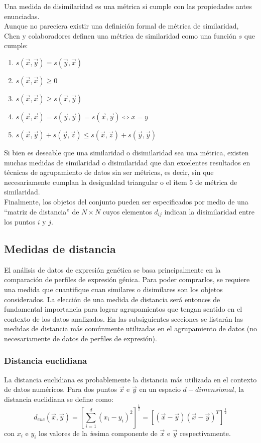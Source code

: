 Una medida de disimilaridad es una métrica si cumple con las propiedades antes enunciadas. \\
Aunque no pareciera existir una definición formal de métrica de similaridad, Chen y colaboradores definen una métrica de similaridad como una función $s$ que cumple:
\begin{enumerate}
\item $s(\vec{x}, \vec{y}) = s(\vec{y}, \vec{x})$
\item $s(\vec{x}, \vec{x}) \geq 0$
\item $s(\vec{x}, \vec{x}) \geq s(\vec{x}, \vec{y})$
\item $s(\vec{x}, \vec{x}) = s(\vec{y}, \vec{y}) = s(\vec{x}, \vec{y}) \iff x=y$
\item $s(\vec{x}, \vec{y}) + s(\vec{y}, \vec{z}) \leq s(\vec{x}, \vec{z}) + s(\vec{y}, \vec{y})$
\end{enumerate}
Si bien es deseable que una similaridad o disimilaridad sea una métrica, existen muchas medidas de similaridad o disimilaridad que dan excelentes resultados en técnicas de agrupamiento de datos sin ser métricas, es decir, sin que necesariamente cumplan la desigualdad triangular o el item 5 de métrica de similaridad.\cite{Chen2009}\\
Finalmente, los objetos del conjunto pueden ser especificados por medio de una ``matriz de distancia'' de $N\times N$ cuyos elementos $d_{ij}$ indican la disimilaridad entre los puntos $i$ y $j$.\cite{Halkidi2001, Domany1999, Gan2007, Kheng2010}

\subsection{Medidas de distancia}
El análisis de datos de expresión genética se basa principalmente en la comparación de perfiles de expresión génica. Para poder comprarlos, se requiere una medida que cuantifique cuan similares o disimilares son los objetos considerados. La elección de una medida de distancia será entonces de fundamental importancia para lograr agrupamientos que tengan sentido en el contexto de los datos analizados. En las subsiguientes secciones se listarán las medidas de distancia más comúnmente utilizadas en el agrupamiento de datos (no necesariamente de datos de perfiles de expresión).
\subsubsection{Distancia euclidiana}
La distancia euclidiana es probablemente la distancia más utilizada en el contexto de datos numéricos. Para dos puntos $\vec{x}$ e $\vec{y}$ en un espacio $d-dimensional$, la distancia euclidiana se define como:
\begin{equation}
	d_{euc}(\vec{x}, \vec{y}) = [\sum\limits_{i=1}^d (x_i-y_i)^2]^\frac{1}{2} = [(\vec{x}-\vec{y})(\vec{x}-\vec{y})^T]^\frac{1}{2}
\end{equation}
con $x_i$ e $y_i$ los valores de la \textit{i}esima componente de $\vec{x}$ e $\vec{y}$ respectivamente.

